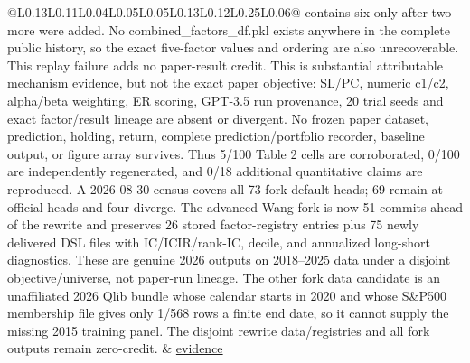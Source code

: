 \begin{longtable}{@{}L{0.13\linewidth}L{0.11\linewidth}L{0.04\linewidth}L{0.05\linewidth}L{0.05\linewidth}L{0.13\linewidth}L{0.12\linewidth}L{0.25\linewidth}L{0.06\linewidth}@{}}
contains six only after two more were added. No combined\_factors\_df.pkl exists anywhere in the complete public history, so the exact five-factor values and ordering are also unrecoverable. This replay failure adds no paper-result credit. This is substantial attributable mechanism evidence, but not the exact paper objective: SL/PC, numeric c1/c2, alpha/beta weighting, ER scoring, GPT-3.5 run provenance, 20 trial seeds and exact factor/result lineage are absent or divergent. No frozen paper dataset, prediction, holding, return, complete prediction/portfolio recorder, baseline output, or figure array survives. Thus 5/100 Table 2 cells are corroborated, 0/100 are independently regenerated, and 0/18 additional quantitative claims are reproduced. A 2026-08-30 census covers all 73 fork default heads; 69 remain at official heads and four diverge. The advanced Wang fork is now 51 commits ahead of the rewrite and preserves 26 stored factor-registry entries plus 75 newly delivered DSL files with IC/ICIR/rank-IC, decile, and annualized long-short diagnostics. These are genuine 2026 outputs on 2018--2025 data under a disjoint objective/universe, not paper-run lineage. The other fork data candidate is an unaffiliated 2026 Qlib bundle whose calendar starts in 2020 and whose S\&P500 membership file gives only 1/568 rows a finite end date, so it cannot supply the missing 2015 training panel. The disjoint rewrite data/registries and all fork outputs remain zero-credit. & \href{https://github.com/RndmVariableQ/AlphaAgent}{evidence} \\

\end{longtable}
